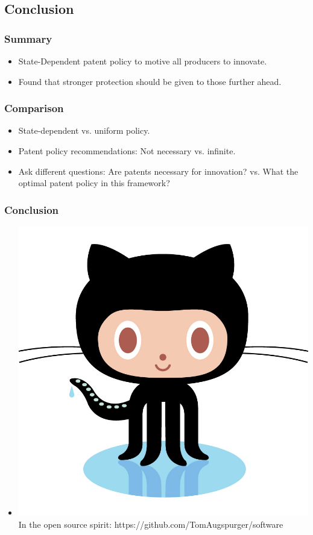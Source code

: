 \documentclass{beamer}
\begin{document}
\subsection{Conclusion}
\label{sub:conclusion}

\begin{frame}[t]\frametitle{Summary}
  \begin{itemize}
    \item<+-> State-Dependent patent policy to motive all producers to innovate.
    \item<+-> Found that stronger protection should be given to those further ahead.
  \end{itemize}  
\end{frame}

\begin{frame}[t]\frametitle{Comparison}
  \begin{itemize}
    \item State-dependent vs. uniform policy.
    \item Patent policy recommendations: Not necessary vs. infinite.
    \item Ask different questions: Are patents necessary for innovation? vs. What the optimal patent policy in this framework?
  \end{itemize}

\end{frame}

\begin{frame}[t]\frametitle{Conclusion}
  \begin{itemize}

    \item \includegraphics[scale=.025]{octocat.jpg} In the open source spirit: https://github.com/TomAugspurger/software

  \end{itemize}    
\end{frame}
\end{document}
